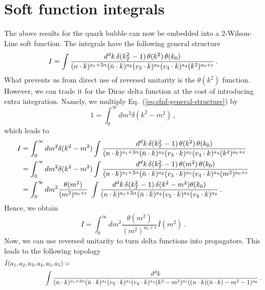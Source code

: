 \documentclass[a4paper,11pt]{report}
\numberwithin{equation}{section}
\begin{document}
\section{Soft function integrals}

The above results for the quark bubble can now be embedded into a 2-Wilson-Line
soft function. The integrals have the following general structure
%
\begin{equation}
  I = \int\frac{d^d k\, \delta(k_T^2-1)\, \theta(k^2)\, \theta(k_0)}
      {(n\cdot k)^{a_1+2\alpha} (\bar{n}\cdot k)^{a_2} (v_3 \cdot k)^{a_3} (v_4
      \cdot k)^{a_4} (k^2)^{a_0+\epsilon}}\,.
  \label{eq:sfnf-general-structure}
\end{equation}
%
What prevents us from direct use of reversed unitarity is the $\theta(k^2)$
function. However, we can trade it for the Dirac delta function at the cost of
introducing extra integration. Namely, we multiply
Eq.~(\ref{eq:sfnf-general-structure}) by 
%
\begin{equation}
  1 = \int_0^\infty dm^2 \delta(k^2-m^2)\,,
\end{equation}
%
which leads to
\begin{align}
  I & = \int_0^\infty dm^2 \delta(k^2-m^2)
      \int\frac{d^d k\, \delta(k_T^2-1)\, \theta(k^2)\, \theta(k_0)}
      {(n\cdot k)^{a_1+2\alpha} (\bar{n}\cdot k)^{a_2} (v_3 \cdot k)^{a_3} (v_4
      \cdot k)^{a_4} (k^2)^{a_0+\epsilon}}
    \nonumber \\
    & = \int_0^\infty dm^2 \delta(k^2-m^2)
      \int\frac{d^d k\, \delta(k_T^2-1)\, \theta(m^2)\, \theta(k_0)}
      {(n\cdot k)^{a_1+2\alpha} (\bar{n}\cdot k)^{a_2} (v_3 \cdot k)^{a_3} (v_4
      \cdot k)^{a_4} (m^2)^{a_0+\epsilon}}
    \nonumber \\
    & = \int_0^\infty dm^2 \frac{\theta(m^2)}{(m^2)^{a_0+\epsilon}}\
      \int\frac{d^d k\, \delta(k_T^2-1)\,\delta(k^2-m^2)  \theta(k_0)}
      {(n\cdot k)^{a_1+2\alpha} (\bar{n}\cdot k)^{a_2} (v_3 \cdot k)^{a_3} (v_4
      \cdot k)^{a_4}}\,.
  \label{eq:}
\end{align}
%
Hence, we obtain
%
\begin{equation}
  I = \int_0^\infty dm^2 \frac{\theta(m^2)}{(m^2)^{a_0+\epsilon}} \bar I (m^2)\,.
\end{equation}
%
Now, we can use reversed unitarity to turn delta functions into propagators.
This leads to the following topology
%
\begin{align}
  \label{eq:topology-bubble}
  \bar I(a_1, a_2, a_3, a_4, a_5, a_5)  
  & =   \\ &  \hspace{-30pt}
  \int \frac{d^d k}
  {(n\cdot k)^{a_1+2\alpha} (\nbar\cdot k)^{a_2} (v_3 \cdot k)^{a_3} (v_4
  \cdot k)^{a_4} (k^2-m^2)^{a_5} ((n\cdot k)(\nbar \cdot k)-m^2-1)^{a_6}}\,.
  \nonumber
\end{align}
\end{document}
